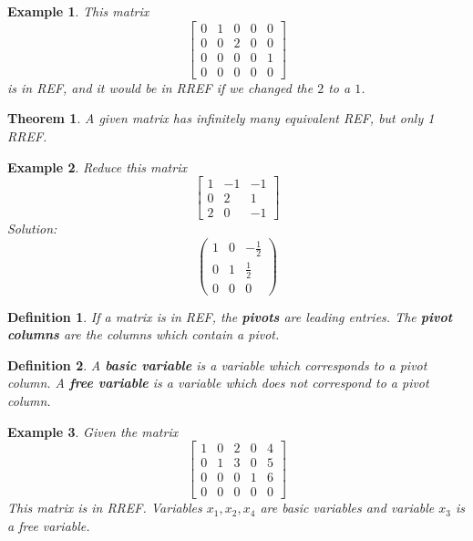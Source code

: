 \documentclass[11pt]{article}
\newtheorem{thm}{Theorem}
\newtheorem{defn}{Definition}
\newtheorem{ex}{Example}
\begin{document}
              \begin{ex}
                This matrix
                \[\begin{bmatrix}
                    0 & 1  & 0 & 0 & 0 \\
                    0 & 0 & 2 & 0 & 0 \\
                    0 & 0 & 0 & 0 & 1 \\
                    0 & 0 & 0 & 0 & 0
                    \end{bmatrix}\]
                  is in REF, and it would be in RREF if we changed the $2$ to a $1$.
                \end{ex}

                \begin{thm}
                A given matrix has infinitely many equivalent REF, but only 1 RREF.
                \end{thm}
                \begin{ex}
                  Reduce this matrix
                  \[
                    \begin{bmatrix}
                      1 & -1 & -1 \\
                      0 & 2 & 1 \\
                      2 & 0 & -1
                      \end{bmatrix}
                  \]
                  Solution:
                  \[
\left(\begin{array}{rrr}
1 & 0 & -\frac{1}{2} \\
0 & 1 & \frac{1}{2} \\
0 & 0 & 0
\end{array}\right)
                  \]
   \end{ex}
 \begin{defn}
   If a matrix is in REF, the \textbf{pivots}
   are leading entries. The \textbf{pivot columns} are
   the columns which contain a pivot.
\end{defn}
\begin{defn}
  A \textbf{basic variable} is a variable which corresponds to a pivot column.
  A \textbf{free variable} is a variable which does not correspond to a pivot column.
\end{defn}
\begin{ex}
  Given the matrix
  \[\begin{bmatrix}
      1 & 0 & 2 & 0 & 4 \\
      0 & 1 & 3 & 0 & 5 \\
      0 & 0 & 0 & 1 & 6 \\
    0 & 0 & 0 & 0 & 0 \end{bmatrix}\]
This matrix is in RREF. Variables $x_{1}, x_{2}, x_{4}$ are basic variables
and variable $x_{3}$ is a free variable.
\end{ex}
\end{document}
